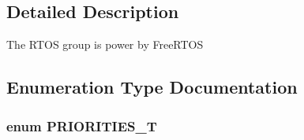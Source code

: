 \subsection{Detailed Description}
The R\-T\-O\-S group is power by Free\-R\-T\-O\-S 

\subsection{Enumeration Type Documentation}
\hypertarget{group___r_t_o_s_ga51e24e4c0498282f564e92975e020c1d}{
\subsubsection[{P\-R\-I\-O\-R\-I\-T\-I\-E\-S\-\_\-\-T}]{\setlength{\rightskip}{0pt plus 5cm}enum {\bf P\-R\-I\-O\-R\-I\-T\-I\-E\-S\-\_\-\-T}}}\label{group___r_t_o_s_ga51e24e4c0498282f564e92975e020c1d}
